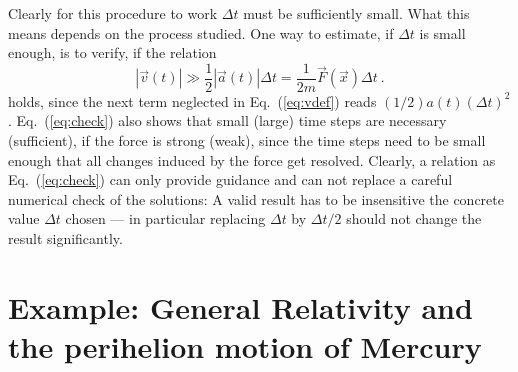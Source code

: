 \documentclass[12pt]{iopart}
\begin{document}
Clearly for this procedure to work $\Delta t$ must be sufficiently small. What this means depends on the process
studied. One way to estimate, if $\Delta t$ is small enough, is to verify, if the relation
\begin{equation}
|\vec v(t)| \gg \frac12|\vec a(t)|\Delta t = \frac{1}{2m}\vec F(\vec x)\Delta t\ . 
\label{eq:check}
\end{equation}
holds, since the next term neglected in Eq.~(\ref{eq:vdef}) reads $(1/2)a(t)(\Delta t)^2$.  Eq.~({\ref{eq:check}})
also shows that small (large) time steps are necessary (sufficient), if the force is strong (weak), since
the time steps need to be small enough that all changes induced by the force get resolved. Clearly,
a relation as Eq.~({\ref{eq:check}}) can only provide guidance and can not replace a careful numerical check of
the solutions: A valid result has to be insensitive the concrete value $\Delta t$ chosen --- in particular replacing
$\Delta t$ by $\Delta t/2$ should not change the result significantly.


\section{Example: General Relativity and the perihelion motion of Mercury}
\end{document}
